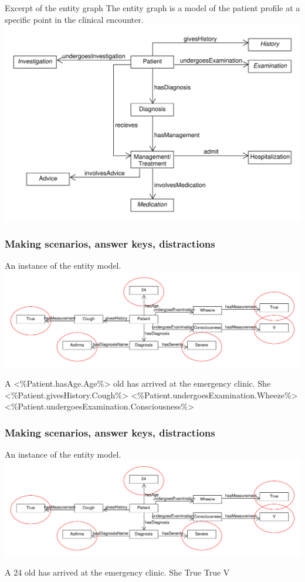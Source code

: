\documentclass{beamer}
\begin{document}
\begin{frame}{Excerpt of the entity graph}
The entity graph is a model of the patient profile at a specific point in the clinical encounter.
\includegraphics[scale=0.45]{SimpleEntityGraph}
\end{frame}


\begin{frame}[fragile]
\frametitle{Making scenarios, answer keys, distractions}
An instance of the entity model.
\includegraphics[scale=0.35]{EntityInstanceGraph}
\begin{semiverbatim}
A <\%Patient.hasAge.Age\%> old has arrived at the 
emergency clinic.  
She <\%Patient.givesHistory.Cough\%> 
<\%Patient.undergoesExamination.Wheeze\%>
<\%Patient.undergoesExamination.Consciousness\%>
\end{semiverbatim}
\end{frame}

\begin{frame}[fragile]
\frametitle{Making scenarios, answer keys, distractions}
An instance of the entity model.
\includegraphics[scale=0.35]{EntityInstanceGraph}
\begin{semiverbatim}
	A 24 old has arrived at the 
	emergency clinic.  
	She True
	True
	V
\end{semiverbatim}
\end{frame}
\end{document}
